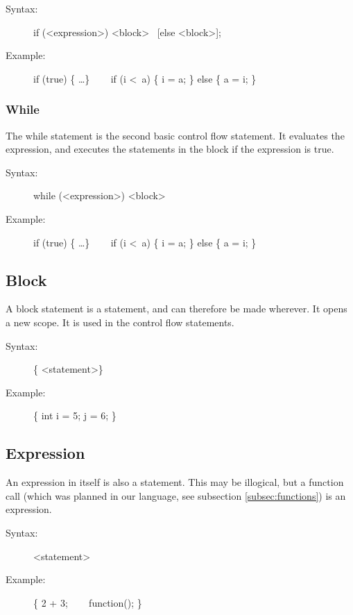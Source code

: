 \documentclass[10pt,a4paper]{report}
\begin{document}
\begin{description}
	\item[Syntax:] 
		if (\textless expression\textgreater ) \textless block\textgreater ~ [else \textless block\textgreater ];
	\item[Example:] 
		if (true) \{ \ldots \} ~~~
		if (i \textless ~a) \{ i = a; \} else \{ a = i; \}
\end{description} 


\subsubsection*{While}
The while statement is the second basic control flow statement. It evaluates the expression, and executes the statements in the block if the expression is true.

\begin{description}
	\item[Syntax:] 
		while (\textless expression\textgreater ) \textless block\textgreater
	\item[Example:] 
		if (true) \{ \ldots \} ~~~
		if (i \textless ~a) \{ i = a; \} else \{ a = i; \}
\end{description} 


\subsection{Block}
A block statement is a statement, and can therefore be made wherever. It opens a new scope. It is used in the control flow statements.

\begin{description}
	\item[Syntax:] 
		\{ \textless statement\textgreater * \}
	\item[Example:] 
		\{ int i = 5; j = 6; \}
\end{description} 

\subsection{Expression}
An expression in itself is also a statement. This may be illogical, but a function call (which was planned in our language, see subsection \ref{subsec:functions}) is an expression.

\begin{description}
	\item[Syntax:] 
		\textless statement\textgreater
	\item[Example:] 
		\{ 2 + 3; ~~~ function(); \}
\end{description} 
\end{document}
